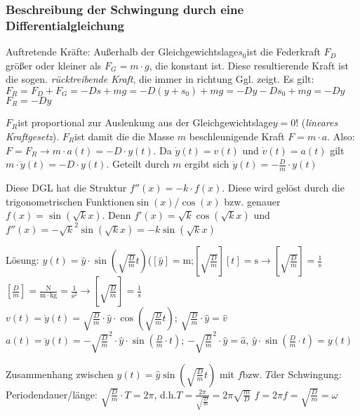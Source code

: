 \documentclass[a4paper]{scrartcl}
\begin{document}
\subsubsection{Beschreibung der Schwingung durch eine Differentialgleichung}
Auftretende Kräfte: Außerhalb der Gleichgewichtslage\(s_0\)ist die Federkraft
\(F_D\)größer oder kleiner als \(F_G = m \cdot g\), die konstant ist. Diese
resultierende Kraft ist die sogen. \emph{rücktreibende Kraft}, die immer in
richtung Ggl. zeigt. Es gilt: \(F_R = F_D + F_G = -Ds + mg = -D(y+s_0) + mg =
-Dy-Ds_0 + mg = -Dy\) \(F_R = -Dy\)%

\(F_R\)ist proportional zur Auslenkung aus der Gleichgewichtslage\(y=0\)!
(\emph{lineares Kraftgesetz}).
\(F_R\)ist damit die die Masse \(m\) beschleunigende Kraft \(F=m \cdot a\).
Also: \(F = F_R \rightarrow m \cdot a(t) = -D \cdot y(t)\). Da \(\dot{y}(t) =
v(t)\) und \(\dot{v}(t) = a(t)\) gilt \(m \cdot \ddot{y}(t) = -D \cdot y(t)\).
Geteilt durch \(m\) ergibt sich \(\ddot{y}(t) = -\frac{D}{m} \cdot y(t)\)

Diese DGL hat die Struktur \(f''(x) = -k \cdot f(x)\). Diese wird gelöst durch
die trigonometrischen Funktionen\(\sin(x)\)/\(\cos(x)\) bzw. genauer \(f(x) =
\sin(\sqrt{k}x)\). Denn \(f'(x) = \sqrt{k} \cos(\sqrt{k}x)\) und \(f''(x) =
-\sqrt{k}^2 \sin(\sqrt{k}x) = -k \sin(\sqrt{k}x)\)

Lösung: \(y(t) = \hat{y} \cdot \sin(\sqrt{\frac{D}{m}}t)\)(\([\hat{y}] =
\mathrm{m}\);\([\sqrt{\frac{D}{m}}][t] = \mathrm{s} \rightarrow
[\sqrt{\frac{D}{m}}] = \frac{1}{\mathrm{s}}\)
\\
\([\frac{D}{m}] = \frac{\mathrm{N}}{\mathrm{m \cdot kg}} =
\frac{1}{\mathrm{s^2}} \rightarrow [\sqrt{\frac{D}{m}}] = \frac{1}{\mathrm{s}}\)
\\
\(v(t) = \dot{y}(t) = \sqrt{\frac{D}{m}} \cdot \hat{y} \cdot
\cos(\sqrt{\frac{D}{m}}t)\); \(\sqrt{\frac{D}{m}} \cdot \hat{y} = \hat{v}\)
\\
\(a(t) = \ddot{y}(t) = -\sqrt{\frac{D}{m}}^2 \cdot \hat{y} \cdot
\sin(\frac{D}{m} \cdot t)\); \(-\sqrt{\frac{D}{m}}^2 \cdot \hat{y} = \hat{a}\),
\(\hat{y} \cdot \sin(\frac{D}{m} \cdot t) = y(t)\)

Zusammenhang zwischen \(y(t) = \hat{y} \sin(\sqrt{\frac{D}{m}} t)\) mit
\(f\)bzw. \(T\)der Schwingung: Periodendauer/länge: \(\sqrt{\frac{D}{m}} \cdot
T = 2 \pi\), d.h.\(T=\frac{2 \pi}{\sqrt{\frac{D}{m}}} = 2 \pi
\sqrt{\frac{m}{D}}\) \(f=2 \pi f = \sqrt{\frac{D}{m}} = \omega\)
\end{document}

